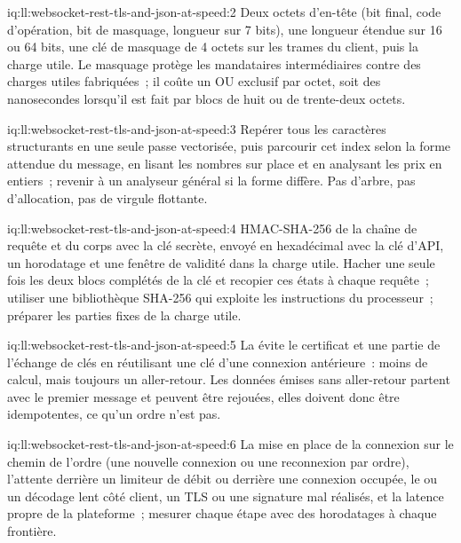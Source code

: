 \begin{solution}{iq:ll:websocket-rest-tls-and-json-at-speed:2}
Deux octets d'en-tête (bit final, code d'opération, bit de masquage, longueur sur 7 bits), une longueur étendue sur 16 ou 64 bits, une clé de masquage de 4 octets sur les trames du client,
puis la charge utile. Le masquage protège les mandataires intermédiaires contre des charges utiles fabriquées~; il coûte un OU exclusif par octet, soit des nanosecondes lorsqu'il est fait
par blocs de huit ou de trente-deux octets.
\end{solution}

\begin{solution}{iq:ll:websocket-rest-tls-and-json-at-speed:3}
Repérer tous les caractères structurants en une seule passe vectorisée, puis parcourir cet index selon la forme attendue du message, en lisant
les nombres sur place et en analysant les prix en entiers~; revenir à un analyseur général si la forme diffère. Pas d'arbre, pas d'allocation,
pas de virgule flottante.
\end{solution}

\begin{solution}{iq:ll:websocket-rest-tls-and-json-at-speed:4}
HMAC-SHA-256 de la chaîne de requête et du corps avec la clé secrète, envoyé en hexadécimal avec la clé d'API, un horodatage et une fenêtre de validité
dans la charge utile. Hacher une seule fois les deux blocs complétés de la clé et recopier ces états à chaque requête~; utiliser une bibliothèque SHA-256 qui exploite les
instructions du processeur~; préparer les parties fixes de la charge utile.
\end{solution}

\begin{solution}{iq:ll:websocket-rest-tls-and-json-at-speed:5}
La  évite le certificat et une partie de l'échange de clés en réutilisant une clé d'une connexion antérieure~: moins de calcul,
mais toujours un aller-retour. Les données émises sans aller-retour partent avec le premier message et peuvent être rejouées, elles doivent donc être idempotentes,
ce qu'un ordre n'est pas.
\end{solution}

\begin{solution}{iq:ll:websocket-rest-tls-and-json-at-speed:6}
La mise en place de la connexion sur le chemin de l'ordre (une nouvelle connexion ou une reconnexion par ordre), l'attente derrière un limiteur de débit ou derrière une
connexion occupée, le  ou un décodage lent côté client, un TLS ou une signature mal réalisés, et la latence propre de la plateforme~;
mesurer chaque étape avec des horodatages à chaque frontière.
\end{solution}
